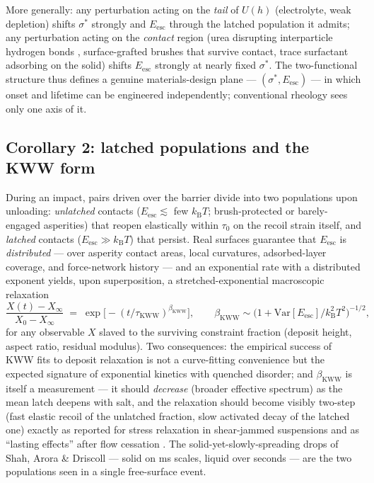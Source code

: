 \documentclass[11pt]{article}
\newcommand{\sigmastar}{\sigma^{*}}
\begin{document}
More generally: any perturbation acting on the \emph{tail} of $U(h)$ (electrolyte, weak depletion) shifts $\sigmastar$ strongly and $E_{\mathrm{esc}}$ through the latched population it admits; any perturbation acting on the \emph{contact} region (urea disrupting interparticle hydrogen bonds \cite{james2018}, surface-grafted brushes that survive contact, trace surfactant adsorbing on the solid) shifts $E_{\mathrm{esc}}$ strongly at nearly fixed $\sigmastar$. The two-functional structure thus defines a genuine materials-design plane --- $(\sigmastar, E_{\mathrm{esc}})$ --- in which onset and lifetime can be engineered independently; conventional rheology sees only one axis of it.

\subsection{Corollary 2: latched populations and the KWW form}
\label{sec:kww}
During an impact, pairs driven over the barrier divide into two populations upon unloading: \emph{unlatched} contacts ($E_{\mathrm{esc}} \lesssim$ few $k_{\mathrm{B}}T$; brush-protected or barely-engaged asperities) that reopen elastically within $\tau_{0}$ on the recoil strain itself, and \emph{latched} contacts ($E_{\mathrm{esc}} \gg k_{\mathrm{B}}T$) that persist. Real surfaces guarantee that $E_{\mathrm{esc}}$ is \emph{distributed} --- over asperity contact areas, local curvatures, adsorbed-layer coverage, and force-network history --- and an exponential rate with a distributed exponent yields, upon superposition, a stretched-exponential macroscopic relaxation
\begin{equation}
\frac{X(t)-X_{\infty}}{X_{0}-X_{\infty}} \;=\; \exp\!\big[-(t/\tau_{\mathrm{KWW}})^{\beta_{\mathrm{KWW}}}\big],
\qquad
\beta_{\mathrm{KWW}} \sim \Big(1 + \mathrm{Var}[E_{\mathrm{esc}}]/k_{\mathrm{B}}^{2}T^{2}\Big)^{-1/2},
\label{eq:kww}
\end{equation}
for any observable $X$ slaved to the surviving constraint fraction (deposit height, aspect ratio, residual modulus). Two consequences: the empirical success of KWW fits to deposit relaxation is not a curve-fitting convenience but the expected signature of exponential kinetics with quenched disorder; and $\beta_{\mathrm{KWW}}$ is itself a measurement --- it should \emph{decrease} (broader effective spectrum) as the mean latch deepens with salt, and the relaxation should become visibly two-step (fast elastic recoil of the unlatched fraction, slow activated decay of the latched one) exactly as reported for stress relaxation in shear-jammed suspensions \cite{barik2022} and as ``lasting effects'' after flow cessation \cite{cho2022}. The solid-yet-slowly-spreading drops of Shah, Arora \& Driscoll \cite{shah2022} --- solid on ms scales, liquid over seconds --- are the two populations seen in a single free-surface event.
\end{document}
